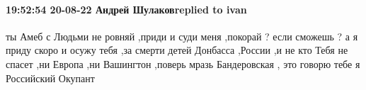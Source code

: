  
 
 
 
 

\paragraph{19:52:54 20-08-22 Андрей Шулаковreplied to ivan}

ты Амеб с Людьми не ровняй ,приди и суди меня ,покорай ? если сможешь ?  а я
приду скоро и осужу тебя ,за смерти детей Донбасса ,России ,и не кто Тебя не
спасет ,ни Европа ,ни Вашингтон ,поверь мразь Бандеровская , это говорю тебе я
Российский Окупант
